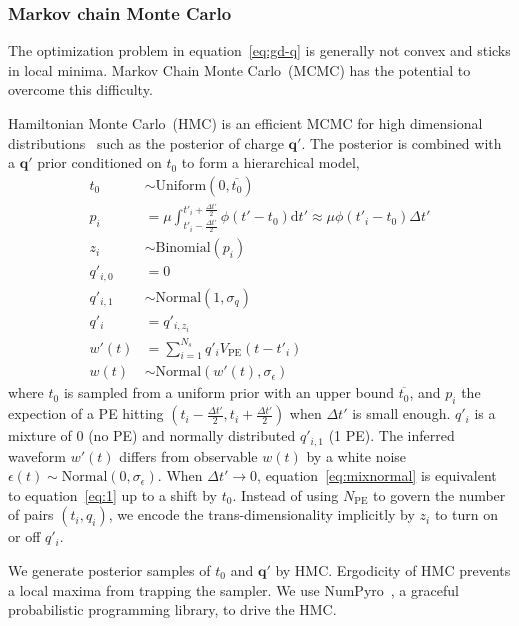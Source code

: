 \subsubsection{Markov chain Monte Carlo}
\label{subsec:mcmc}
The optimization problem in equation~\eqref{eq:gd-q} is generally not convex and sticks in local minima. Markov Chain Monte Carlo~(MCMC) has the potential to overcome this difficulty.

Hamiltonian Monte Carlo~(HMC) is an efficient MCMC for high dimensional distributions~\cite{neal_mcmc_2012} such as the posterior of charge $\bm{q'}$. The posterior is combined with a $\bm{q'}$ prior conditioned on $t_0$ to form a hierarchical model, 
\begin{equation}
  \begin{aligned}
    t_{0} &\sim \mathrm{Uniform}(0, \overline{t_0}) \\
    p_i &= \mu \int_{t'_i-\frac{\Delta t'}{2}}^{t'_i+\frac{\Delta t'}{2}} \phi(t' - t_0)\mathrm{d}t' \approx \mu\phi(t'_i - t_0)\Delta{t'} \\
    z_i &\sim \mathrm{Binomial}(p_i) \\
    q'_{i,0}&=0\\
    q'_{i,1}& \sim \mathrm{Normal}(1, \sigma_q)\\
    q'_i &= q'_{i,z_i}\\
    w'(t) & = \sum_{i=1}^{N_s}q'_iV_\mathrm{PE}(t-t'_i)\\
    w(t) &\sim \mathrm{Normal}(w'(t), \sigma_\epsilon)
  \end{aligned}
  \label{eq:mixnormal}
\end{equation}
where $t_{0}$ is sampled from a uniform prior with an upper bound $\overline{t_{0}}$, and $p_i$ the expection of a PE hitting $(t_{i} - \frac{\Delta t'}{2}, t_{i} + \frac{\Delta t'}{2})$ when $\Delta t'$ is small enough. $q'_i$ is a mixture of 0 (no PE) and normally distributed $q'_{i,1}$ (1 PE). The inferred waveform $w'(t)$ differs from observable $w(t)$ by a white noise $\epsilon(t) \sim \mathrm{Normal}(0, \sigma_\epsilon)$. When $\Delta{t'} \to 0$, equation~\eqref{eq:mixnormal} is equivalent to equation~\eqref{eq:1} up to a shift by $t_0$. Instead of using $N_\mathrm{PE}$ to govern the number of pairs $(t_i, q_i)$, we encode the trans-dimensionality implicitly by $z_i$ to turn on or off $q'_i$. 

We generate posterior samples of $t_0$ and $\bm{q'}$ by HMC. Ergodicity of HMC prevents a local maxima from trapping the sampler. We use NumPyro~\cite{phan2019composable}, a graceful probabilistic programming library, to drive the HMC. 

